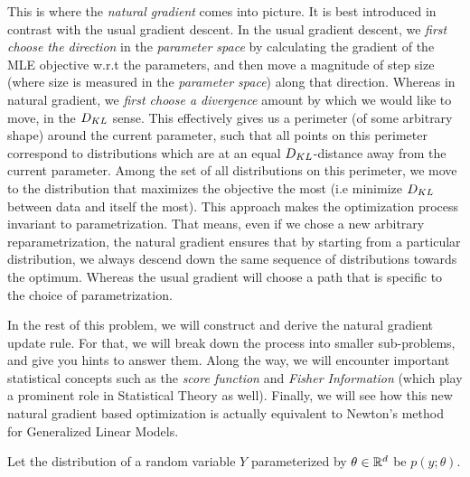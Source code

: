 This is where the \emph{natural gradient} comes into picture. It is best introduced in contrast
with the usual gradient descent. In the usual gradient descent, we \emph{first choose the direction} in the \emph{parameter space}
by calculating the gradient of the MLE objective w.r.t the parameters, and then move a magnitude of
step size (where size is measured in the \emph{parameter space}) along that direction. Whereas
in natural gradient, we \emph{first choose a divergence} amount by which we would like to
move, in the $D_{KL}$ sense. This effectively gives us a perimeter (of some arbitrary shape) around the 
current parameter, such that all points on this perimeter correspond to distributions
which are at an equal $D_{KL}$-distance away from the current parameter. Among the set
of all distributions on this perimeter, we move to the distribution that maximizes the
objective the most (i.e minimize $D_{KL}$ between data and itself the most). This approach makes the optimization
process invariant to parametrization. That means, even if we chose a new arbitrary reparametrization,
the natural gradient ensures that by starting from a particular distribution, we always descend down the same sequence of
distributions towards the optimum. Whereas the usual gradient will choose a path that is specific
to the choice of parametrization.


In the rest of this problem, we will construct and derive the natural gradient update rule.
For that, we will break down the process into smaller sub-problems, and give you hints
to answer them. Along the way, we will encounter important statistical concepts such
as the \emph{score function} and \emph{Fisher Information} (which play a prominent role
in Statistical Theory as well). Finally, we will see how this new natural gradient
based optimization is actually equivalent to Newton's method for Generalized Linear Models.


Let the distribution of a random variable $Y$ parameterized by $\theta \in \mathbb{R}^{{d}}$ be $p(y;\theta)$.

\begin{enumerate}

\ifnum{} {
  
} \fi



\ifnum{} {
  
} \fi



\ifnum{} {
  
} \fi



\ifnum{} {
  
} \fi



\ifnum{} {
  
} \fi



\ifnum{} {
  
} \fi

\end{enumerate}
